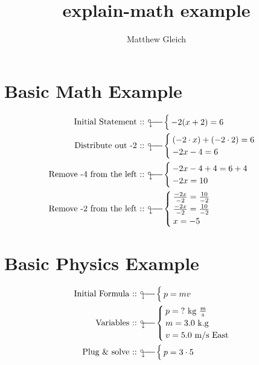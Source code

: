 \documentclass{report}
\title{explain-math example}
\author{Matthew Gleich}
\date{}
\begin{document}
    \maketitle

    \section{Basic Math Example}
        \begin{align*}
            \statement{-2(x + 2) = 6}
            \explain{Distribute out -2}{
                \step{ (-2 \cdot x) + (-2 \cdot 2) = 6 }
                \step{ -2x - 4 = 6 }
            }
            \explain{Remove -4 from the left}{
                \step{ -2x - 4 + 4 = 6 + 4 }
                \step{ -2x = 10 }
            }
            \explain{Remove -2 from the left}{
                \step{ \frac{-2x}{-2} = \frac{10}{-2} }
                \step{ \frac{-2x}{-2} = \frac{10}{-2} }
                \step{ x = -5 }
            }
        \end{align*}

    \section{Basic Physics Example}
        \begin{align*}
            \formula{p = mv}
            \variables{
                \varu{p}{\text{?}}{kg $ \frac{\text{m}}{\text{s}} $}
                \varu{m}{3.0}{k.g}
                \varu{v}{5.0}{m/s East}
            }
            \explain{Plug \& solve}{p = 3 \cdot 5}
        \end{align*}
\end{document}
